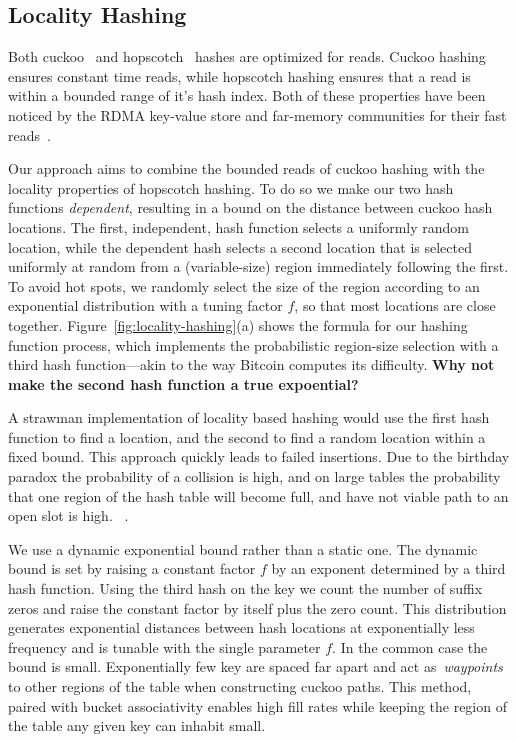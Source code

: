 \subsection{Locality Hashing}
Both cuckoo~\cite{cuckoo} and hopscotch~\cite{hopscotch}
hashes are optimized for reads. Cuckoo hashing ensures
constant time reads, while hopscotch hashing ensures that a
read is within a bounded range of it's hash index. Both of
these properties have been noticed by the RDMA key-value
store and far-memory communities for their fast
reads~\cite{memc3,cuckoo-improvements,pilaf,farm}.

Our approach aims to combine the bounded reads of cuckoo hashing with
the locality properties of hopscotch hashing.  To do so we make our
two hash functions \textit{dependent}, resulting in a bound on the
distance between cuckoo hash locations.  The first, independent, hash
function selects a uniformly random location, while the dependent hash
selects a second location that is selected uniformly at random from a
(variable-size) region immediately following the first.  To avoid hot
spots, we randomly select the size of the region according to an
exponential distribution with a tuning factor $f$, so that most
locations are close together.
Figure~\ref{fig:locality-hashing}(a) shows the formula for our hashing
function process, which implements the probabilistic region-size
selection with a third hash function---akin to the way Bitcoin
computes its difficulty.
\textbf{Why not make the second hash function a true expoential?}

A strawman implementation of locality based hashing would
use the first hash function to find a location, and the
second to find a random location within a fixed bound. This
approach quickly leads to failed insertions. Due to the
birthday paradox the probability of a collision is high, and
on large tables the probability that one region of the hash
table will become full, and have not viable path to an open
slot is high. ~.

We use a dynamic exponential bound rather than a static one.
The dynamic bound is set by raising a constant factor $f$ by
an exponent determined by a third hash function. Using the
third hash on the key we count the number of suffix zeros
and raise the constant factor by itself plus the zero count.
This distribution generates exponential distances between
hash locations at exponentially less frequency and is
tunable with the single parameter $f$.
In the common case the bound is small. Exponentially few key
are spaced far apart and act as~\textit{waypoints} to other
regions of the table when constructing cuckoo paths. This
method, paired with bucket associativity enables high fill
rates while keeping the region of the table any given key
can inhabit small.

